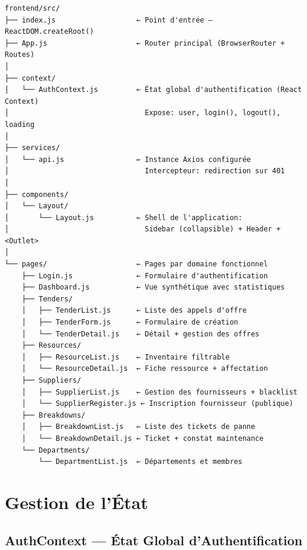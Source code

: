\documentclass[12pt,a4paper]{report}
\begin{document}
\begin{center}
\begin{verbatim}
frontend/src/
├── index.js                   ← Point d'entrée — ReactDOM.createRoot()
├── App.js                     ← Router principal (BrowserRouter + Routes)
│
├── context/
│   └── AuthContext.js         ← État global d'authentification (React Context)
│                                Expose: user, login(), logout(), loading
│
├── services/
│   └── api.js                 ← Instance Axios configurée
│                                Intercepteur: redirection sur 401
│
├── components/
│   └── Layout/
│       └── Layout.js          ← Shell de l'application:
│                                Sidebar (collapsible) + Header + <Outlet>
│
└── pages/                     ← Pages par domaine fonctionnel
    ├── Login.js               ← Formulaire d'authentification
    ├── Dashboard.js           ← Vue synthétique avec statistiques
    ├── Tenders/
    │   ├── TenderList.js      ← Liste des appels d'offre
    │   ├── TenderForm.js      ← Formulaire de création
    │   └── TenderDetail.js    ← Détail + gestion des offres
    ├── Resources/
    │   ├── ResourceList.js    ← Inventaire filtrable
    │   └── ResourceDetail.js  ← Fiche ressource + affectation
    ├── Suppliers/
    │   ├── SupplierList.js    ← Gestion des fournisseurs + blacklist
    │   └── SupplierRegister.js ← Inscription fournisseur (publique)
    ├── Breakdowns/
    │   ├── BreakdownList.js   ← Liste des tickets de panne
    │   └── BreakdownDetail.js ← Ticket + constat maintenance
    └── Departments/
        └── DepartmentList.js  ← Départements et membres
\end{verbatim}
\end{center}

\section{Gestion de l'État}

\subsection{AuthContext — État Global d'Authentification}
\end{document}
